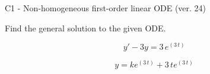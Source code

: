 \begin{exercise}
  \begin{exerciseTitle}C1 - Non-homogeneous first-order linear ODE (ver. 24)\end{exerciseTitle}
  \begin{exerciseStatement}
    
Find the general solution to the given ODE.

    
\[y'-3y= 3 \, e^{\left(3 \, t\right)}\]

  \end{exerciseStatement}
  \begin{exerciseAnswer}
    
\[y= k e^{\left(3 \, t\right)} + 3 \, t e^{\left(3 \, t\right)}\]

  \end{exerciseAnswer}
\end{exercise}
